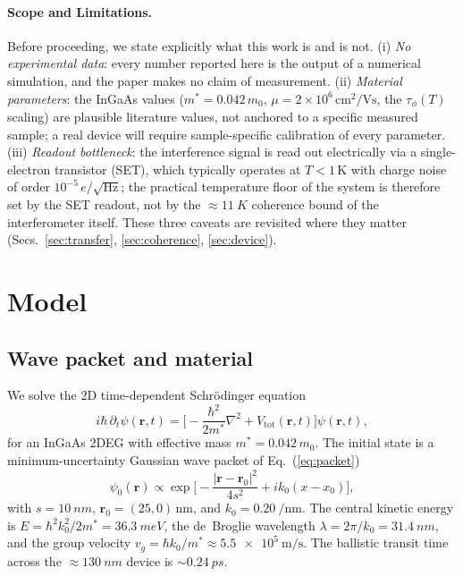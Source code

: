 \documentclass[11pt,a4paper]{article}
\begin{document}
\paragraph{Scope and Limitations.} Before proceeding, we state explicitly
what this work is and is not. (i) \emph{No experimental data}: every number
reported here is the output of a numerical simulation, and the paper makes
no claim of measurement. (ii) \emph{Material parameters}: the InGaAs values
($m^*=0.042\,m_0$, $\mu=2\times10^6\,\text{cm}^2\text{/Vs}$, the
$\tau_\phi(T)$ scaling) are plausible literature values, not anchored to a
specific measured sample; a real device will require sample-specific
calibration of every parameter. (iii) \emph{Readout bottleneck}: the
interference signal is read out electrically via a single-electron
transistor (SET), which typically operates at $T<1\,\mathrm{K}$ with charge
noise of order $10^{-5}\,e/\sqrt{\mathrm{Hz}}$; the practical temperature
floor of the system is therefore set by the SET readout, not by the
$\approx\SI{11}{K}$ coherence bound of the interferometer itself. These
three caveats are revisited where they matter
(Secs.~\ref{sec:transfer}, \ref{sec:coherence}, \ref{sec:device}).

\section{Model}
\label{sec:model}

\subsection{Wave packet and material}
\label{sec:packet}

We solve the 2D time-dependent Schr\"odinger equation
\begin{equation}
i\hbar\,\partial_t\psi(\mathbf{r},t) = \Big[-\frac{\hbar^2}{2m^*}\nabla^2 +
V_{\text{tot}}(\mathbf{r},t)\Big]\psi(\mathbf{r},t),
\label{eq:schr}
\end{equation}
for an InGaAs 2DEG with effective mass $m^* = 0.042\,m_0$. The initial state 
is a minimum-uncertainty Gaussian wave packet of Eq.~(\ref{eq:packet})
\begin{equation}
\psi_0(\mathbf{r}) \propto \exp\!\Big[-\frac{|\mathbf{r}-\mathbf{r}_0|^2}{4s^2}
+ i k_0 (x-x_0)\Big],
\label{eq:packet}
\end{equation}
with $s = \SI{10}{nm}$, $\mathbf{r}_0 = (25,0)\,\text{nm}$, and 
$k_0 = \SI{0.20}{\per\nano\meter}$. The central kinetic energy is 
$E = \hbar^2 k_0^2/2m^* = \SI{36.3}{meV}$, the de~Broglie wavelength 
$\lambda = 2\pi/k_0 = \SI{31.4}{nm}$, and the group velocity 
$v_g = \hbar k_0/m^* \approx \SI{5.5e5}{\meter\per\second}$. The ballistic transit time 
across the $\approx\SI{130}{nm}$ device is $\sim\SI{0.24}{ps}$.
\end{document}

